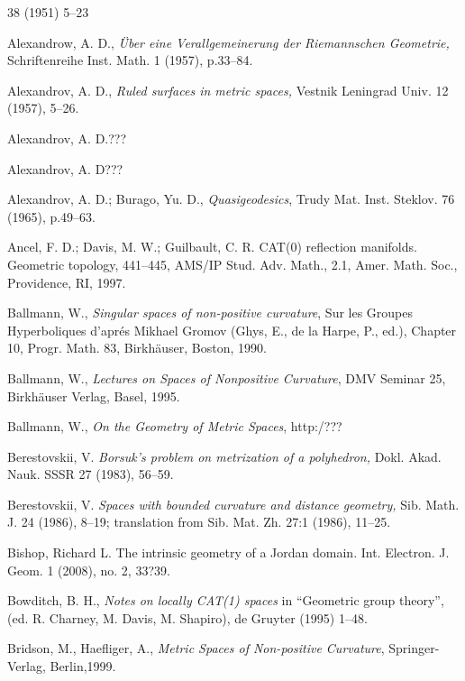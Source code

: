 \begin{thebibliography}{52}
38 (1951) 5--23

 Alexandrow, A. D.,  \textit{\"Uber eine Verallgemeinerung der Riemannschen Geometrie,}
Schriftenreihe Inst. Math. 1 (1957), p.33--84.

 Alexandrov, A. D., \textit{Ruled surfaces in metric spaces,}
Vestnik Leningrad Univ. 12  (1957), 5--26.

 Alexandrov, A. D.???

 Alexandrov, A. D???

 Alexandrov, A. D.; Burago, Yu. D., \textit{Quasigeodesics}, Trudy Mat. Inst. Steklov.
76 (1965), p.49--63.

Ancel, F. D.; Davis, M. W.; Guilbault, C. R.
CAT(0) reflection manifolds. Geometric topology, 441--445,
AMS/IP Stud. Adv. Math., 2.1, Amer. Math. Soc., Providence, RI, 1997.

Ballmann, W., \textit{Singular spaces of non-positive curvature}, Sur les Groupes Hyperboliques d'apr\'{e}s Mikhael Gromov (Ghys, E., de la Harpe, P., ed.), Chapter 10, Progr. Math. 83, Birkh\"auser, Boston, 1990. 


Ballmann, W., \textit{Lectures on Spaces of Nonpositive Curvature}, DMV Seminar 25, Birkh\"auser Verlag, Basel, 1995. 

Ballmann, W., \textit{On the Geometry of Metric Spaces}, http:/???

 Berestovskii, V. 
\textit{Borsuk's problem on metrization of a polyhedron,}  
Dokl. Akad. Nauk. SSSR 27 (1983), 56--59.

 Berestovskii, V. 
\textit{Spaces with bounded curvature and distance geometry,}  
Sib. Math. J. 24 (1986), 8--19;
translation from Sib. Mat. Zh. 27:1 (1986), 11--25.

Bishop, Richard L. The intrinsic geometry of a Jordan domain. Int. Electron. J. Geom. 1 (2008), no. 2, 33?39.

 Bowditch, B. H.,
\textit{Notes on locally CAT(1) spaces} 
in ``Geometric group theory'', (ed. R. Charney, M. Davis, M. Shapiro), de Gruyter (1995) 1--48.

Bridson, M., Haefliger, A.,
\textit{Metric Spaces of Non-positive Curvature},
Springer-Verlag, Berlin,1999.


\end{thebibliography}
